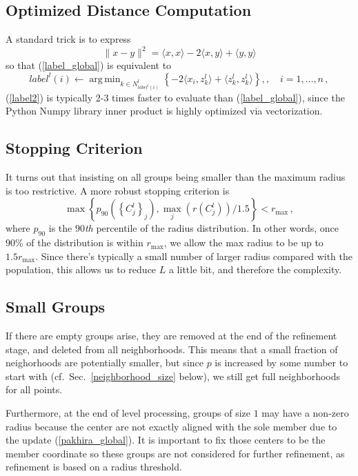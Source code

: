 \documentclass[11pt]{article}
\newcommand{\lp}{\left(}
\newcommand{\rp}{\right)}
\newcommand{\lb}{\left\{}
\newcommand{\rb}{\right\}}
\newcommand{\rmax}{r_{\text{max}}}
\DeclareMathOperator*{\argmin}{arg\,min}
\begin{document}
\subsection{Optimized Distance Computation}
\label{distance}
A standard trick is to express
\begin{equation}
	\|x - y\|^2 = \langle x, x \rangle - 2 \langle x, y \rangle + \langle y, y \rangle
\end{equation}
so that  (\ref{label_global}) is equivalent to
\begin{equation}
	label^l(i) \leftarrow \argmin_{k \in N^l_{label^l(i)}} \lb  -2 \langle x_i, z^l_k \rangle + \langle z^l_k, z^l_k \rangle  \rb,,\quad i = 1,\dots,n\,,
	\label{label2}
\end{equation}
(\ref{label2}) is typically 2-3 times faster to evaluate than (\ref{label_global}), since the Python Numpy library inner product is highly optimized via vectorization.

\subsection{Stopping Criterion}
\label{stopping}
It turns out that insisting on all groups being smaller than the maximum radius is too restrictive. A more robust stopping criterion is
\begin{equation}
	\max \lb p_{90}\lp\lb C_j^l \rb_j\rp, \max_j \lp r(C_j^l) \rp / 1.5 \rb < \rmax\,,
	\label{stop}
\end{equation}
where $p_{90}$ is the $90${\it th} percentile of the radius distribution. In other words, once $90\%$ of the distribution is within $\rmax$, we allow the max radius to be up to $1.5 \rmax$. Since there's typically a small number of larger radius compared with the population, this allows us to reduce $L$ a little bit, and therefore the complexity.

\subsection{Small Groups}
\label{small}
If there are empty groups arise, they are removed at the end of the refinement stage, and deleted from all neighborhoods. This means that a small fraction of neighorhoods are potentially smaller, but since $p$ is increased by some number to start with (cf.~Sec.~\ref{neighborhood_size} below), we still get full neighborhoods for all points.

Furthermore, at the end of level processing, groups of size $1$ may have a non-zero radius because the center are not exactly aligned with the sole member due to the update (\ref{pakhira_global}). It is important to fix those centers to be the member coordinate so these groups are not considered for further refinement, as refinement is based on a radius threshold.
\end{document}
